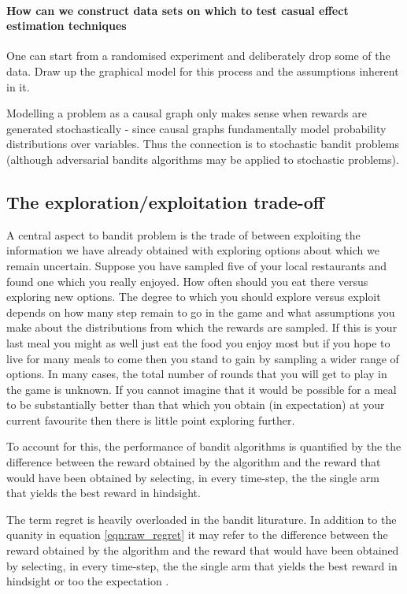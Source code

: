 \paragraph*{How can we construct data sets on which to test casual effect estimation techniques}
One can start from a randomised experiment and deliberately drop some of the data. Draw up the graphical model for this process and the assumptions inherent in it. 

Modelling a problem as a causal graph only makes sense when rewards are generated stochastically - since causal graphs fundamentally model probability distributions over variables. Thus the connection is to stochastic bandit problems (although adversarial bandits algorithms may be applied to stochastic problems).

\subsection{The exploration/exploitation trade-off}
A central aspect to bandit problem is the trade of between exploiting the information we have already obtained with exploring options about which we remain uncertain. Suppose you have sampled five of your local restaurants and found one which you really enjoyed. How often should you eat there versus exploring new options. The degree to which you should explore versus exploit depends on how many step remain to go in the game and what assumptions you make about the distributions from which the rewards are sampled. If this is your last meal you might as well just eat the food you enjoy most but if you hope to live for many meals to come then you stand to gain by sampling a wider range of options. In many cases, the total number of rounds that you will get to play in the game is unknown. If you cannot imagine that it would be possible for a meal to be substantially better than that which you obtain (in expectation) at your current favourite then there is little point exploring further. 


To account for this, the performance of bandit algorithms is quantified by the the difference between the reward obtained by the algorithm and the reward that would have been obtained by selecting, in every time-step, the the single arm that yields the best reward in hindsight.


The term regret is heavily overloaded in the bandit liturature. In addition to the quanity in equation \ref{eqn:raw_regret} it may refer to the difference between the reward obtained by the algorithm and the reward that would have been obtained by selecting, in every time-step, the the single arm that yields the best reward in hindsight \citep{} or too the expectation .

